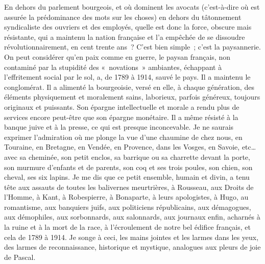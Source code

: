 \documentclass[french,twoside]{book} %
\begin{document}
En dehors du parlement bourgeois, et où dominent les avocats (c’est-à-dire où est assurée la prédominance des mots sur les choses) en dehors du tâtonnement syndicaliste des ouvriers et des employés, quelle est donc la force, obscure mais résistante, qui a maintenu la nation française et l’a empêchée de se dissoudre révolutionnairement, en cent trente ans ? C’est bien simple ; c’est la paysannerie. On peut considérer qu’en paix comme en guerre, le paysan français, non contaminé par la stupidité des « novations » ambiantes, échappant à l’effritement social par le sol, a, de 1789 à 1914, sauvé le pays. Il a maintenu le conglomérat. Il a alimenté la bourgeoisie, versé en elle, à chaque génération, des éléments physiquement et moralement sains, laborieux, parfois généreux, toujours originaux et puissants. Son épargne intellectuelle et morale a rendu plus de services encore peut-être que son épargne monétaire. Il a même résisté à la banque juive et à la presse, ce qui est presque inconcevable. Je ne saurais exprimer l’admiration où me plonge la vue d’une chaumine de chez nous, en Touraine, en Bretagne, en Vendée, en Provence, dans les Vosges, en Savoie, etc… avec sa cheminée, son petit enclos, sa barrique ou sa charrette devant la porte, son murmure d’enfants et de parents, son coq et ses trois poules, son chien, son cheval, ses six lapins. Je me dis que ce petit ensemble, humain et divin, a tenu tête aux assauts de toutes les balivernes meurtrières, à Rousseau, aux Droits de l’Homme, à Kant, à Robespierre, à Bonaparte, à leurs apologistes, à Hugo, au romantisme, aux banquiers juifs, aux politiciens républicains, aux démagogues, aux démophiles, aux sorbonnards, aux salonnards, aux journaux enfin, acharnés à la ruine et à la mort de la race, à l’écroulement de notre bel édifice français, et cela de 1789 à 1914. Je songe à ceci, les mains jointes et les larmes dans les yeux, des larmes de reconnaissance, historique et mystique, analogues aux pleurs de joie de Pascal.\par
\end{document}
